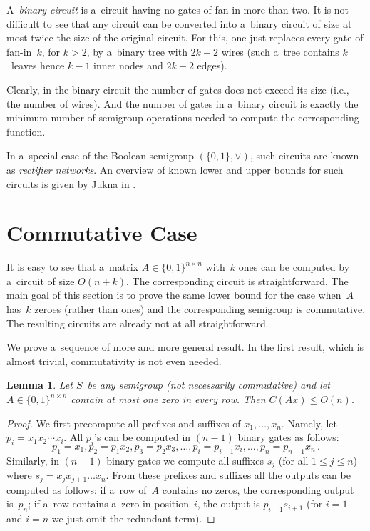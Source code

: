 \documentclass[11pt,letterpaper]{article}
\newtheorem{lemma}{Lemma}
\begin{document}
A~{\em binary circuit} is a~circuit having no gates of fan-in more than two. It is not difficult to see that any circuit can be converted into a~binary circuit of size at most twice the size of the original circuit. For this, one just replaces every gate of fan-in~$k$, for $k>2$, by a~binary tree with $2k-2$ wires (such a~tree contains $k$~leaves hence $k-1$ inner nodes and $2k-2$ edges).

Clearly, in the binary circuit the number of gates does not exceed its size (i.e., the number of wires). And the number of gates in a~binary circuit is exactly the minimum number of semigroup operations needed to compute the corresponding function.

In a~special case of the Boolean semigroup $(\{0,1\}, \lor)$, such circuits are known as {\em rectifier networks}. An overview of known lower and upper bounds for such circuits is given by Jukna in \cite[Section~13.6]{DBLP:books/daglib/0028687}.




\section{Commutative Case}
It is easy to see that a~matrix $A \in \{0,1\}^{n \times n}$
with~$k$ ones can be computed by a~circuit of size $O(n+k)$. 
The corresponding circuit is straightforward. The main goal of 
this section is to prove the same lower bound for the case 
when~$A$ has~$k$ zeroes (rather than ones) and the 
corresponding semigroup is commutative. The resulting circuits 
are already not at all straightforward.  

We prove a~sequence of more and more general result. In the first result, which is almost trivial,  commutativity is not even needed.


\begin{lemma}\label{lemma:easy}
Let $S$~be {\em any} semigroup (not necessarily commutative) and let $A \in \{0,1\}^{n \times n}$ contain at most one zero in every row. Then $C(Ax) \le O(n)$.
\end{lemma}
\begin{proof}
We first precompute all prefixes and suffixes of $x_1, \dotsc, x_n$. Namely, let $p_i=x_1x_2\dotsb x_i$. All $p_i$'s can be computed in $(n-1)$ binary gates as follows:
\[p_1=x_1, p_2=p_1x_2, p_3=p_2x_3, \dotsc, p_i=p_{i-1}x_i, \dotsc, p_n=p_{n-1}x_n \, .\]
Similarly, in $(n-1)$ binary gates we compute all suffixes $s_j$ 
(for all $1 \le j \le n$) where $s_j=x_jx_{j+1}\dotsc x_n$. From 
these prefixes and suffixes all the outputs can be computed as 
follows: if a~row of~$A$ contains no zeros, the corresponding 
output is~$p_n$; if a~row contains a~zero in position~$i$, the 
output is $p_{i-1}s_{i+1}$ (for $i=1$ and $i=n$ we just omit 
the redundant term).
\end{proof}
\end{document}

